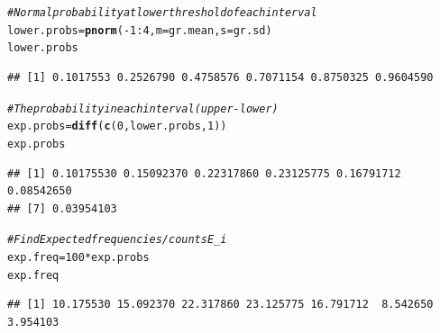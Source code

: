 \documentclass[t,xcolor=pdftex,dvipsnames,table]{beamer}
\makeatletter
\newcommand{\hlnum}[1]{\textcolor[rgb]{0.686,0.059,0.569}{#1}}%
\newcommand{\hlcom}[1]{\textcolor[rgb]{0.678,0.584,0.686}{\textit{#1}}}%
\newcommand{\hlopt}[1]{\textcolor[rgb]{0,0,0}{#1}}%
\newcommand{\hlstd}[1]{\textcolor[rgb]{0.345,0.345,0.345}{#1}}%
\newcommand{\hlkwb}[1]{\textcolor[rgb]{0.69,0.353,0.396}{#1}}%
\newcommand{\hlkwc}[1]{\textcolor[rgb]{0.333,0.667,0.333}{#1}}%
\newcommand{\hlkwd}[1]{\textcolor[rgb]{0.737,0.353,0.396}{\textbf{#1}}}%
\newenvironment{kframe}{%
 \def\at@end@of@kframe{}%
 \ifinner\ifhmode%
  \def\at@end@of@kframe{\end{minipage}}%
  \begin{minipage}{\columnwidth}%
 \fi\fi%
 \def\FrameCommand##1{\hskip\@totalleftmargin \hskip-\fboxsep
 \colorbox{shadecolor}{##1}\hskip-\fboxsep
     \hskip-\linewidth \hskip-\@totalleftmargin \hskip\columnwidth}%
 \MakeFramed {\advance\hsize-\width
   \@totalleftmargin\z@ \linewidth\hsize
   \@setminipage}}%
 {\par\unskip\endMakeFramed%
 \at@end@of@kframe}
\newenvironment{knitrout}{}{} %
\makeatother
\begin{document}
\begin{frame}[fragile]{}
\begin{knitrout}
\color{fgcolor}\begin{kframe}
\begin{alltt}
\hlcom{#Normal probability at lower threshold of each interval}
\hlstd{lower.probs}\hlkwb{=}\hlkwd{pnorm}\hlstd{(}\hlopt{-}\hlnum{1}\hlopt{:}\hlnum{4}\hlstd{,}\hlkwc{m}\hlstd{=gr.mean,}\hlkwc{s}\hlstd{=gr.sd)}
\hlstd{lower.probs}
\end{alltt}
\begin{verbatim}
## [1] 0.1017553 0.2526790 0.4758576 0.7071154 0.8750325 0.9604590
\end{verbatim}
\begin{alltt}
\hlcom{#The probability in each interval (upper-lower)}
\hlstd{exp.probs}\hlkwb{=}\hlkwd{diff}\hlstd{(}\hlkwd{c}\hlstd{(}\hlnum{0}\hlstd{,lower.probs,}\hlnum{1}\hlstd{))}
\hlstd{exp.probs}
\end{alltt}
\begin{verbatim}
## [1] 0.10175530 0.15092370 0.22317860 0.23125775 0.16791712 0.08542650
## [7] 0.03954103
\end{verbatim}
\begin{alltt}
\hlcom{#Find Expected frequencies/counts E_i}
\hlstd{exp.freq}\hlkwb{=} \hlnum{100}\hlopt{*} \hlstd{exp.probs}
\hlstd{exp.freq}
\end{alltt}
\begin{verbatim}
## [1] 10.175530 15.092370 22.317860 23.125775 16.791712  8.542650  3.954103
\end{verbatim}
\end{kframe}
\end{knitrout}
\end{frame}
\end{document}
